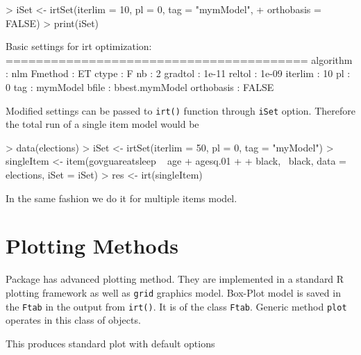 \documentclass{amsart}
\newcommand{\R}{{\normalfont\textsf{R }}{}}
\begin{document}
\begin{Schunk}
\begin{Sinput}
> iSet <- irtSet(iterlim = 10, pl = 0, tag = "mymModel", 
+     orthobasis = FALSE)
> print(iSet)
\end{Sinput}
\begin{Soutput}
 Basic settings for irt optimization:
 ======================================== 
        algorithm : nlm
          Fmethod : ET
            ctype : F
               nb : 2
          gradtol : 1e-11
           reltol : 1e-09
          iterlim : 10
               pl : 0
              tag : mymModel
            bfile : bbest.mymModel
       orthobasis : FALSE
\end{Soutput}
\end{Schunk}
Modified settings can be passed to {\tt irt()} function through {\tt iSet} option. Therefore the total run of a single item model would be 
\begin{Schunk}
\begin{Sinput}
> data(elections)
> iSet <- irtSet(iterlim = 50, pl = 0, tag = "myModel")
> singleItem <- item(govguareatsleep ~ age + agesq.01 + 
+     black, ~black, data = elections, iSet = iSet)
> res <- irt(singleItem)
\end{Sinput}
\end{Schunk}
In the same fashion we do it for multiple items model.

\newpage
\section{Plotting Methods}
Package has advanced plotting method. They are implemented in a standard \R plotting framework as well as {\tt grid} graphics model. Box-Plot model is saved in the {\tt Ftab} in the output from {\tt irt()}. It is of the class {\tt Ftab}. Generic method {\tt plot}  operates in this class of objects. 

\begin{Schunk}
\end{Schunk}
This produces standard plot with default options
\end{document}
